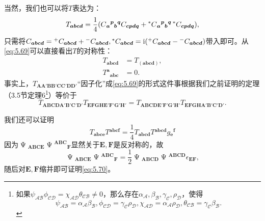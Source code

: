 当然，我们也可以将$T$表达为：
\begin{equation*}
	T_{\boldsymbol{abcd}} =\frac{1}{4} (C{_{\boldsymbol{a}}}^{\boldsymbol{p}}{}{_{\boldsymbol{b}}}^{\boldsymbol{q}} C_{\boldsymbol{cpdq}} +\prescript{*}{}{} C{_{\boldsymbol{a}}}^{\boldsymbol{p}}{}{_{\boldsymbol{b}}}^{\boldsymbol{q}}\prescript{*}{}{} C_{\boldsymbol{cpdq}} ),
\end{equation*}
只需将$C_{\boldsymbol{abcd}} =\prescript{+}{}{} C_{\boldsymbol{abcd}} +\prescript{-}{}{} C_{\boldsymbol{abcd}} ,\prescript{*}{}{} C_{\boldsymbol{abcd}} =\mathrm{i} (\prescript{+}{}{} C_{\boldsymbol{abcd}} -\prescript{-}{}{} C_{\boldsymbol{abcd}} )$带入即可。从\ref{eq:5.69}可以直接看出$T$的对称性：
\begin{equation*}
	\begin{aligned}
		T_{\boldsymbol{abcd}} & =T_{(\boldsymbol{abcd})} ,\\
		T^{\boldsymbol{a}}{}_{\boldsymbol{abc}} & =0.
	\end{aligned}
\end{equation*}
事实上，$T_{\boldsymbol{AA} '\boldsymbol{BB} '\boldsymbol{CC} '\boldsymbol{DD} '}$“因子化”成\ref{eq:5.69}的形式这件事根据我们之前证明的定理（3.5节定理6\footnote{如果$\psi _{\mathcal{AB}} \phi _{\mathcal{CD}} =\chi _{\mathcal{AD}} \theta _{\mathcal{CB}} \neq 0$，那么存在$\alpha _{\mathcal{A}} ,\beta _{\mathcal{B}} ,\gamma _{\mathcal{C}} ,\rho _{\mathcal{D}}$，使得
	\begin{equation*}
		\psi _{\mathcal{AB}} =\alpha _{\mathcal{A}} \beta _{\mathcal{B}} ,\phi _{\mathcal{CD}} =\gamma _{\mathcal{C}} \rho _{\mathcal{D}} ,\chi _{\mathcal{AD}} =\alpha _{\mathcal{A}} \rho _{\mathcal{D}} ,\theta _{\mathcal{CB}} =\gamma _{\mathcal{C}} \beta _{\mathcal{B}} .
\end{equation*}}）等价于
\begin{equation*}
	T\boldsymbol{_{ABCDA'B'C'D'}} T\boldsymbol{_{EFGHE'F'G'H'}} =T\boldsymbol{_{ABCDE'F'G'H'}} T\boldsymbol{_{EFGHA'B'C'D'}} .
\end{equation*}

我们还可以证明
\begin{equation}
	T\boldsymbol{_{abce}} T\boldsymbol{^{abcf}} =\frac{1}{4} T\boldsymbol{_{abcd}} T\boldsymbol{^{abcd}} g\boldsymbol{{_{e}}^{f}}
	\label{eq:5.70}
\end{equation}
因为$\upPsi \boldsymbol{_{ABCE}} \upPsi \boldsymbol{^{ABC}{}_{F}}$显然关于$\boldsymbol{E} ,\boldsymbol{F}$是反对称的，故
\begin{equation*}
	\upPsi \boldsymbol{_{ABCE}} \upPsi \boldsymbol{^{ABC}{}_{F}} =\frac{1}{2} \upPsi \boldsymbol{_{ABCD}} \upPsi \boldsymbol{^{ABCD}} \epsilon \boldsymbol{_{EF}} ,
\end{equation*}
随后对$\boldsymbol{E} ,\boldsymbol{F}$缩并即可证明\ref{eq:5.70}。

